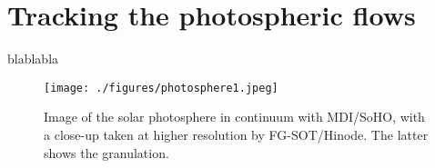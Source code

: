 \documentclass[braunschweig]{09-11-14-thesis}
\begin{document}
\section{Tracking the photospheric flows}

blablabla

\begin{figure*}[h]
\centering
\texttt{[image: ./figures/photosphere1.jpeg]}
\caption{Image of the solar photosphere in continuum with MDI/SoHO,  
with a close-up taken at higher resolution by FG-SOT/Hinode. The  
latter shows the granulation.}  \label{granulation}
\end{figure*}	
\end{document}
